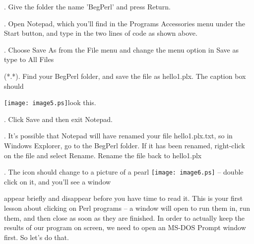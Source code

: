\documentclass[a4paper,11pt]{book}
\begin{document}
\noindent 

.   Give the folder the name 'BegPerl' and press Return.

\noindent 

.   Open Notepad, which you'll find in the Programs \textbar  Accessories menu under the Start button, and type in the two lines of code as shown above.

\noindent 

.   Choose Save As from the File menu and change the menu option in Save as type to All Files

\noindent (*.*). Find your BegPerl folder, and save the file as hello1.plx. The caption box should

\noindent \texttt{[image: image5.ps]}look this.

\noindent 

\noindent 

\noindent 

\noindent 

\noindent 

\noindent 

\noindent 

\noindent 

\noindent 

\noindent 

\noindent 

\noindent 

\noindent 

\noindent 

\noindent 

.   Click Save and then exit Notepad.

\noindent 

.   It's possible that Notepad will have renamed your file hello1.plx.txt, so in Windows Explorer, go to the BegPerl folder. If it has been renamed, right-click on the file and select Rename. Rename the file back to hello1.plx

\noindent 

\noindent 

.   The icon should change to a picture of a pearl \texttt{[image: image6.ps]} -- double click on it, and you'll see a window

\noindent appear briefly and disappear before you have time to read it. This is your first lesson about clicking on Perl programs -- a window will open to run them in, run them, and then close as soon as they are finished. In order to actually keep the results of our program on screen, we need to open an MS-DOS Prompt window first. So let's do that.
\end{document}
